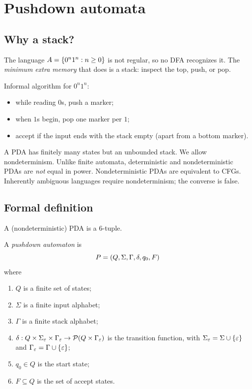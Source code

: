\section{Pushdown automata}

\subsection{Why a stack?}
The language $A=\{0^n1^n:n\geq 0\}$ is not regular, so
no DFA recognizes it. The \emph{minimum extra memory} that does is a stack:
inspect the top, push, or pop.

Informal algorithm for $0^n1^n$:
\begin{itemize}
  \item while reading $0$s, push a marker;
  \item when $1$s begin, pop one marker per $1$;
  \item accept if the input ends with the stack empty (apart from a bottom
        marker).
\end{itemize}
A PDA has finitely many states but an unbounded stack. We allow
nondeterminism. Unlike finite automata, deterministic and nondeterministic
PDAs are \emph{not} equal in power. Nondeterministic PDAs are equivalent to
CFGs. Inherently ambiguous languages require nondeterminism; the converse is
false.

\subsection{Formal definition}
A (nondeterministic) PDA is a $6$-tuple.

\begin{definition}[PDA]
A \emph{pushdown automaton} is
\[
  P=(Q,\Sigma,\Gamma,\delta,q_0,F)
\]
where
\begin{enumerate}
  \item $Q$ is a finite set of states;
  \item $\Sigma$ is a finite input alphabet;
  \item $\Gamma$ is a finite stack alphabet;
  \item $\delta:Q\times\Sigma_\varepsilon\times\Gamma_\varepsilon\to\mathcal{P}(Q\times\Gamma_\varepsilon)$
        is the transition function, with $\Sigma_\varepsilon=\Sigma\cup\{\varepsilon\}$ and
        $\Gamma_\varepsilon=\Gamma\cup\{\varepsilon\}$;
  \item $q_0\in Q$ is the start state;
  \item $F\subseteq Q$ is the set of accept states.
\end{enumerate}
\end{definition}

